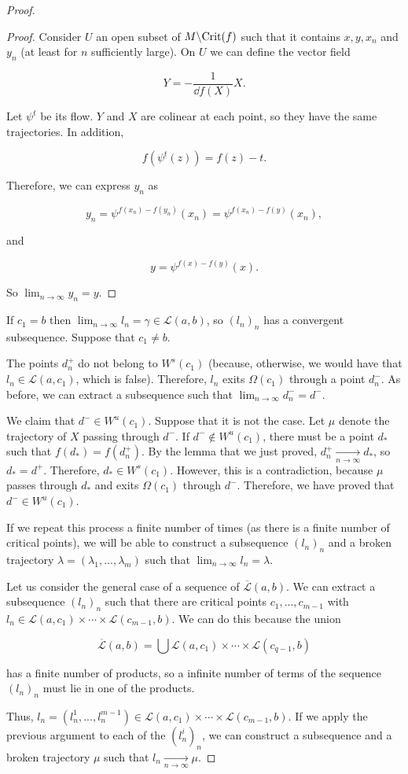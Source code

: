 \begin{proof}
\begin{proof}
Consider $U$ an open subset of $M \backslash \text{Crit}(f)$ such that it contains $x,y, x_n$ and $y_n$ (at least for $n$ sufficiently large). On $U$ we can define the vector field

$$Y = - \frac1{\dd f(X)} X .$$

Let $\psi^t$ be its flow. $Y$ and $X$ are colinear at each point, so they have the same trajectories. In addition,

$$f(\psi^t(z)) = f(z) - t .$$

Therefore, we can express $y_n$ as

$$y_n = \psi^{f(x_n)-f(y_n)}(x_n) = \psi^{f(x_n)-f(y)}(x_n) ,$$

and

$$y = \psi^{f(x)-f(y)}(x) .$$

So $\lim_{n \rightarrow \infty} y_n = y$.
\end{proof}

If $c_1 = b$ then $\lim_{n \rightarrow \infty} l_n = \gamma \in \mathcal{L}(a,b)$, so $(l_n)_n$ has a convergent subsequence. Suppose that $c_1 \neq b$.

The points $d_n^+$ do not belong to $W^s(c_1)$ (because, otherwise, we would have that $l_n \in \mathcal{L}(a,c_1)$, which is false). Therefore, $l_n$ exits $\Omega(c_1)$ through a point $d_n^-$. As before, we can extract a subsequence such that $\lim_{n \rightarrow \infty} d_n^- = d^-$.

We claim that $d^- \in W^u(c_1)$. Suppose that it is not the case. Let $\mu$ denote the trajectory of $X$ passing through $d^-$. If $d^- \notin W^u(c_1)$, there must be a point $d_{\ast}$ such that $f(d_{\ast}) = f(d_n^+)$. By the lemma that we just proved, $d_n^+ \xrightarrow[n \rightarrow \infty]{} d_{\ast}$, so $d_{\ast} = d^+$. Therefore, $d_{\ast} \in W^s(c_1)$. However, this is a contradiction, because $\mu$ passes through $d_{\ast}$ and exits $\Omega(c_1)$ through $d^-$. Therefore, we have proved that $d^- \in W^u(c_1)$.

If we repeat this process a finite number of times (as there is a finite number of critical points), we will be able to construct a subsequence $(l_n)_n$ and a broken trajectory $\lambda = (\lambda_1,...,\lambda_m)$ such that $\lim_{n \rightarrow \infty} l_n = \lambda$.

Let us consider the general case of a sequence of $\overline{\mathcal{L}}(a,b)$. We can extract a subsequence $(l_n)_n$ such that there are critical points $c_1,...,c_{m-1}$ with $l_n \in \mathcal{L}(a,c_1) \times \cdots \times \mathcal{L}(c_{m-1},b)$. We can do this because the union

$$\overline{\mathcal{L}}(a,b) = \bigcup \mathcal{L}(a,c_1) \times \cdots \times \mathcal{L}(c_{q-1},b)$$

has a finite number of products, so a infinite number of terms of the sequence $(l_n)_n$ must lie in one of the products.

Thus, $l_n = (l_n^1,...,l_n^{m-1}) \in \mathcal{L}(a,c_1) \times \cdots \times \mathcal{L}(c_{m-1},b)$. If we apply the previous argument to each of the $(l_n^i)_n$, we can construct a subsequence and a broken trajectory $\mu$ such that $l_n \xrightarrow[n \rightarrow \infty]{} \mu$.
\end{proof}
